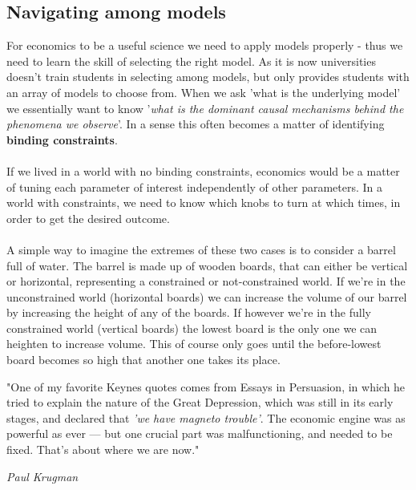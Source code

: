 \documentclass[12pt, a4paper]{article}
\begin{document}
\begin{multicols}{2}
\subsection{Navigating among models}
For economics to be a useful science we need to apply models properly - thus we need to learn the skill of selecting the right model. As it is now universities doesn't train students in selecting among models, but only provides students with an array of models to choose from. When we ask 'what is the underlying model' we essentially want to know '\textit{what is the dominant causal mechanisms behind the phenomena we observe}'. In a sense this often becomes a matter of identifying \textbf{binding constraints}.
\\ \\
If we lived in a world with no binding constraints, economics would be a matter of tuning each parameter of interest independently of other parameters. In a world with constraints, we need to know which knobs to turn at which times, in order to get the desired outcome. 
\\ \\
A simple way to imagine the extremes of these two cases is to consider a barrel full of water. The barrel is made up of wooden boards, that can either be vertical or horizontal, representing a constrained or not-constrained world. If we're in the unconstrained world (horizontal boards) we can increase the volume of our barrel by increasing the height of any of the boards. If however we're in the fully constrained world (vertical boards) the lowest board is the only one we can heighten to increase volume. This of course only goes until the before-lowest board becomes so high that another one takes its place. 

\epigraph{"One of my favorite Keynes quotes comes from Essays in Persuasion, in which he tried to explain the nature of the Great Depression, which was still in its early stages, and declared that \textit{'we have magneto trouble'}. The economic engine was as powerful as ever — but one crucial part was malfunctioning, and needed to be fixed. That’s about where we are now."}{\textit{Paul Krugman}}


\end{multicols}
\end{document}
